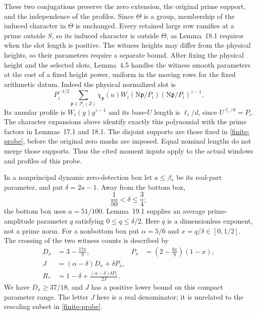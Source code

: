 \documentclass[10pt,reqno,a4paper]{amsart}
\theoremstyle{remark}
\newcommand{\N}{\mathrm N}
\newcommand{\pp}{\mathfrak p}
\newcommand{\bp}{\beta_*}
\begin{document}
These two conjugations preserve the zero extension, the original prime
support, and the independence of the profiles. Since $\Theta$ is a group, membership
of the induced character in $\Theta$ is unchanged. Every retained
large row ramifies at a prime outside $S$, so its induced character
is outside $\Theta$, as Lemma~18.1 requires when the slot length is
positive. The witness heights may differ from the physical heights, so their
parameters require a separate bound.
After fixing the physical height and the selected slots, Lemma~4.5
handles the witness smooth parameters at the cost of a fixed height
power, uniform in the moving rows for the fixed arithmetic datum.
Indeed the physical normalized slot is
\[
 P_i^{-1/2}\sum_{\pp\in\mathcal P_i(Z)}
 \overline{\chi_\pp(u)}W_i(\N\pp/P_i)
                         (\N\pp/P_i)^{z-1}.
\]
Its annular profile is $W_i(y)y^{z-1}$ and its base-$U$ length is
$\ell_i/d$, since $U^{\ell_i/d}=P_i$. The character expansions above
identify exactly this polynomial with the prime factors in Lemmas~17.1
and 18.1. The disjoint supports are those fixed in
\eqref{finite-probe}, before the original zero masks are imposed.
Equal nominal lengths do not merge those supports. Thus the cited moment
inputs apply to the actual windows and profiles of this probe.

In a nonprincipal dynamic zero-detection box let $a\le\bp$ be its
real-part parameter, and put $\delta=2a-1$. Away from the bottom box,
\[
                 \frac1{50}<\delta\le\frac34;
\]
the bottom box uses $a=51/100$. Lemma~19.1 supplies an average
prime-amplitude parameter $q$ satisfying $0\le q\le\delta/2$.
Here $q$ is a dimensionless exponent, not a prime norm. For a
nonbottom box put $\alpha=5/6$ and $x=q/\delta\in[0,1/2]$.
The crossing of the two witness counts is described by
\begin{equation}\label{crossing}
\begin{aligned}
 D_x&=3-\frac{17x}{9},
 &P_x&=\left(2-\frac{8x}{9}\right)(1-x),\\
 J&=(\alpha-\delta)D_x+\delta P_x,\\
 R_*&=1-\delta+
        \frac{(\alpha-\delta)\delta P_x}{2J}.
\end{aligned}
\end{equation}
We have $D_x\ge37/18$, and $J$ has a positive lower bound on this
compact parameter range. The letter $J$ here is a real denominator;
it is unrelated to the rescaling subset in \eqref{finite-probe}.
\end{document}
